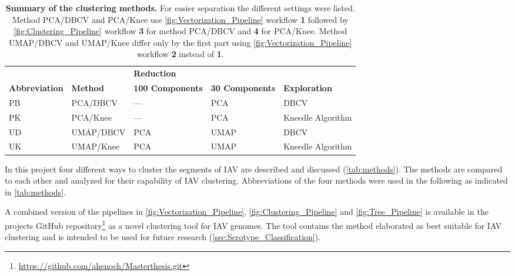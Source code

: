 \begin{table}[!hbt]
    \footnotesize
    \centering
    \caption[Summary of the clustering methods]{\textbf{Summary of the clustering methods.} For easier separation the different settings were listed. Method PCA/DBCV and PCA/Knee use \autoref{fig:Vectorization_Pipeline} workflow \textsf{\textbf{1}} followed by \autoref{fig:Clustering_Pipeline} workflow \textsf{\textbf{3}} for method PCA/DBCV and \textsf{\textbf{4}} for PCA/Knee. Method UMAP/DBCV and UMAP/Knee differ only by the first part using \autoref{fig:Vectorization_Pipeline} workflow \textsf{\textbf{2}} instead of \textsf{\textbf{1}}.}
    \label{tab:methods}
    \begin{tabular*}{\textwidth}{@{\extracolsep{\fill}\hspace{6pt}}lllll}
        \toprule
        & & \multicolumn{2}{l}{\textbf{Reduction}} & \\
        \cmidrule(lr){3-4}
        \textbf{Abbreviation} & \textbf{Method} & \textbf{100 Components} & \textbf{30 Components} & \textbf{Exploration}\\
        \midrule
        PB & PCA/DBCV & --- & PCA & DBCV\\
        PK & PCA/Knee & --- & PCA & Kneedle Algorithm\\
        UD & UMAP/DBCV & PCA & UMAP & DBCV\\
        UK & UMAP/Knee & PCA & UMAP & Kneedle Algorithm\\
        \bottomrule
    \end{tabular*}
\end{table}

In this project four different ways to cluster the segments of \gls{IAV} are described and discussed (\autoref{tab:methods}). The methods are compared to each other and analyzed for their capability of \gls{IAV} clustering. Abbreviations of the four methods were used in the following as indicated in \autoref{tab:methods}.%

\vspace{1em}

A combined version of the pipelines in \autoref{fig:Vectorization_Pipeline}, \autoref{fig:Clustering_Pipeline} and \autoref{fig:Tree_Pipeline} is available in the projects GitHub repository\footnote{\url{https://github.com/ahenoch/Masterthesis.git}} as a novel clustering tool for \gls{IAV} genomes. The tool contains the method elaborated as best suitable for \gls{IAV} clustering and is intended to be used for future research (\autoref{sec:Serotype_Classification}).

